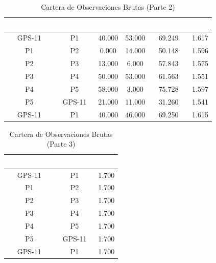 \documentclass[11pt,letterpaper]{article}
\begin{document}
\begin{table}[H]
  \centering
  \small
  \caption{Cartera de Observaciones Brutas (Parte 2)}
  \label{tab:campo_1}
  \begin{tabular}{|c|c|c|c|c|c|}
    \hline
    \rowcolor{GeoBlue}
    \textcolor{white}{\textbf{Estacionado}} & \textcolor{white}{\textbf{Pto\_Obs}} & \textcolor{white}{\textbf{Z\_M}} & \textcolor{white}{\textbf{Z\_S}} & \textcolor{white}{\textbf{Dist\_Inc}} & \textcolor{white}{\textbf{hi}} \\
    \hline
    \rowcolor{GeoBlue!5}
    GPS-11 & P1 & 40.000 & 53.000 & 69.249 & 1.617 \\
    \hline
    \rowcolor{white}
    P1 & P2 & 0.000 & 14.000 & 50.148 & 1.596 \\
    \hline
    \rowcolor{GeoBlue!5}
    P2 & P3 & 13.000 & 6.000 & 57.843 & 1.575 \\
    \hline
    \rowcolor{white}
    P3 & P4 & 50.000 & 53.000 & 61.563 & 1.551 \\
    \hline
    \rowcolor{GeoBlue!5}
    P4 & P5 & 58.000 & 3.000 & 75.728 & 1.597 \\
    \hline
    \rowcolor{white}
    P5 & GPS-11 & 21.000 & 11.000 & 31.260 & 1.541 \\
    \hline
    \rowcolor{GeoBlue!5}
    GPS-11 & P1 & 40.000 & 46.000 & 69.250 & 1.615 \\
    \hline
  \end{tabular}
\end{table}
\vspace{0.8cm}
\begin{table}[H]
  \centering
  \small
  \caption{Cartera de Observaciones Brutas (Parte 3)}
  \label{tab:campo_2}
  \begin{tabular}{|c|c|c|}
    \hline
    \rowcolor{GeoBlue}
    \textcolor{white}{\textbf{Estacionado}} & \textcolor{white}{\textbf{Pto\_Obs}} & \textcolor{white}{\textbf{hr}} \\
    \hline
    \rowcolor{GeoBlue!5}
    GPS-11 & P1 & 1.700 \\
    \hline
    \rowcolor{white}
    P1 & P2 & 1.700 \\
    \hline
    \rowcolor{GeoBlue!5}
    P2 & P3 & 1.700 \\
    \hline
    \rowcolor{white}
    P3 & P4 & 1.700 \\
    \hline
    \rowcolor{GeoBlue!5}
    P4 & P5 & 1.700 \\
    \hline
    \rowcolor{white}
    P5 & GPS-11 & 1.700 \\
    \hline
    \rowcolor{GeoBlue!5}
    GPS-11 & P1 & 1.700 \\
    \hline
  \end{tabular}
\end{table}
\vspace{0.8cm}
\end{document}
